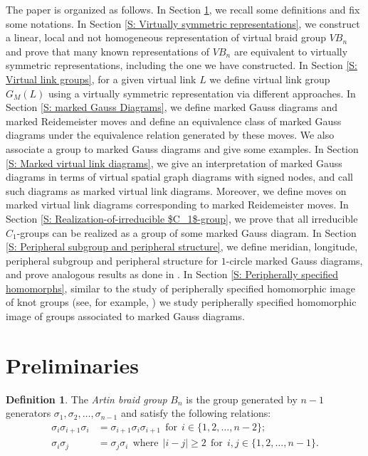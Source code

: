 \documentclass[11 pt, reqno]{amsart}
\theoremstyle{definition}
\newtheorem{definition}[theorem]{Definition}
\numberwithin{equation}{subsection}
\begin{document}
The paper is organized as follows. In Section \ref{S: prelim}, we recall some definitions and fix some notations. In Section \ref{S: Virtually symmetric representations}, we construct a linear, local and not homogeneous representation of virtual braid group $VB_n$ and prove that many known representations of $VB_n$ are equivalent to virtually symmetric representations, including the one we have constructed. In Section \ref{S: Virtual link groups}, for a given virtual link $L$ we define virtual link group $G_M(L)$ using a virtually symmetric representation via different approaches. In Section \ref{S: marked Gauss Diagrams}, we define marked Gauss diagrams and marked Reidemeister moves and define an equivalence class of marked Gauss diagrams under the equivalence relation generated by these moves. We also associate a group to marked Gauss diagrams and give some examples. In Section \ref{S: Marked virtual link diagrams}, we give an interpretation of marked Gauss diagrams in terms of virtual spatial graph diagrams with signed nodes, and call such diagrams as marked virtual link diagrams. Moreover, we define moves on marked virtual link diagrams corresponding to marked Reidemeister moves. In Section \ref{S: Realization-of-irreducible $C_1$-group}, we prove that all irreducible $C_1$-groups can be realized as a group of some marked Gauss diagram. In Section \ref{S: Peripheral subgroup and peripheral structure}, we define meridian, longitude, peripheral subgroup and peripheral structure for $1$-circle marked Gauss diagrams, and prove analogous results as done in \cite{Kim-1}. In Section \ref{S: Peripherally specified homomorphs}, similar to the study of peripherally specified homomorphic image of knot groups (see, for example, \cite{EL-1, Acuna-1, Johnson-1, JL-1, Kim-1, Neuwirth-1}) we study peripherally specified homomorphic image of groups associated to marked Gauss diagrams.

\medskip




\section{Preliminaries}\label{S: prelim}

\begin{definition}
The \textit{Artin braid group} $B_n$ is the group generated by $n-1$ generators $\sigma_1, \sigma_2, \ldots, \sigma_{n-1}$ and satisfy the following relations:
\begin{align*}
\sigma_i \sigma_{i+1} \sigma_i &= \sigma_{i+1} \sigma_i \sigma_{i+1} ~~\textrm{for}~~i \in \{1,2,\ldots,n-2\};\\
\sigma_i \sigma_j &= \sigma_j \sigma_i ~~\textrm{where}~~ |i-j| \geq 2 ~~\textrm{for}~~ i,j \in \{1,2, \ldots, n-1\}.
\end{align*}
\end{definition}
\end{document}
